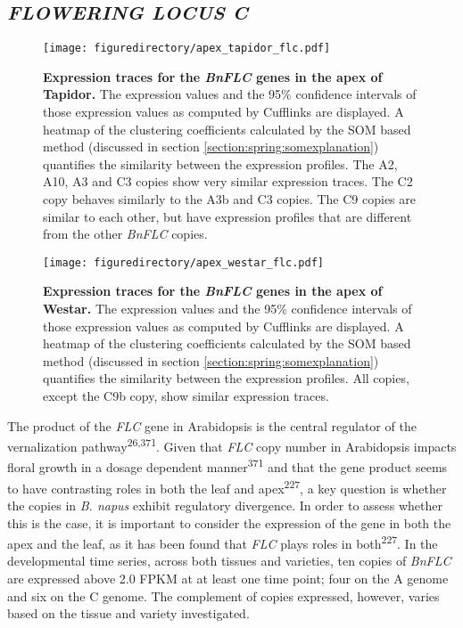 \documentclass[12pt,]{book}
\begin{document}
\subsection{\texorpdfstring{\emph{FLOWERING LOCUS
C}}{FLOWERING LOCUS C}}\label{section:winter:flc}

\begin{figure}[htbp]
\centering
\texttt{[image: figuredirectory/apex\_tapidor\_flc.pdf]}
\caption{\textbf{Expression traces for the \emph{BnFLC} genes in the
apex of Tapidor.} The expression values and the 95\% confidence
intervals of those expression values as computed by Cufflinks are
displayed. A heatmap of the clustering coefficients calculated by the
SOM based method (discussed in section
\ref{section:spring:somexplanation}) quantifies the similarity between
the expression profiles. The A2, A10, A3 and C3 copies show very similar
expression traces. The C2 copy behaves similarly to the A3b and C3
copies. The C9 copies are similar to each other, but have expression
profiles that are different from the other \emph{BnFLC}
copies.}\label{figure:3xx:flctapapex}
\end{figure}

\begin{figure}[htbp]
\centering
\texttt{[image: figuredirectory/apex\_westar\_flc.pdf]}
\caption{\textbf{Expression traces for the \emph{BnFLC} genes in the
apex of Westar.} The expression values and the 95\% confidence intervals
of those expression values as computed by Cufflinks are displayed. A
heatmap of the clustering coefficients calculated by the SOM based
method (discussed in section \ref{section:spring:somexplanation})
quantifies the similarity between the expression profiles. All copies,
except the C9b copy, show similar expression
traces.}\label{figure:3xx:flcwesapex}
\end{figure}

The product of the \emph{FLC} gene in Arabidopsis is the central
regulator of the vernalization pathway\textsuperscript{26,371}. Given
that \emph{FLC} copy number in Arabidopsis impacts floral growth in a
dosage dependent manner\textsuperscript{371} and that the gene product
seems to have contrasting roles in both the leaf and
apex\textsuperscript{227}, a key question is whether the copies in
\emph{B. napus} exhibit regulatory divergence. In order to assess
whether this is the case, it is important to consider the expression of
the gene in both the apex and the leaf, as it has been found that
\emph{FLC} plays roles in both\textsuperscript{227}. In the
developmental time series, across both tissues and varieties, ten copies
of \emph{BnFLC} are expressed above 2.0 FPKM at at least one time point;
four on the A genome and six on the C genome. The complement of copies
expressed, however, varies based on the tissue and variety investigated.
\end{document}
